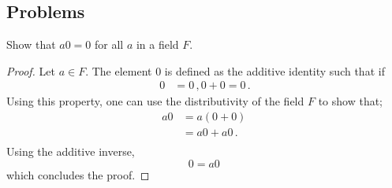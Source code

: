 \clearpage
\subsection{Problems}

\begin{problem}
    Show that $a0 = 0$ for all $a$ in a field $F$.
\end{problem}
\begin{proof}
    Let $a\in F$. The element $0$ is defined as the additive identity such that if
    \begin{align*}
        0 &= 0\,,
        0 + 0 = 0\,.
    \end{align*}
    Using this property, one can use the distributivity of the field $F$ to show that;
    \begin{align*}
        a0 &= a(0 + 0)\,\\
        &= a0 + a0\,.\\
    \end{align*}
    Using the additive inverse, 
    \begin{equation}
        0 = a0\,
    \end{equation}
    which concludes the proof.
\end{proof}

\fullpageboxline

